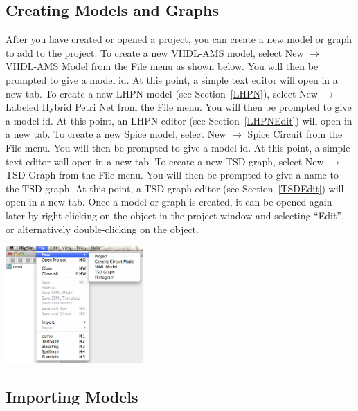 \documentclass[titlepage,11pt]{article}
\begin{document}
\subsection{Creating Models and Graphs}

\noindent
After you have created or opened a project, you can create a
new model or graph to add to the project.  To create a new 
VHDL-AMS model, select  New $\rightarrow$ VHDL-AMS Model from the
File menu as shown below. You will then be prompted to give a model id. At this
point, a simple text editor will open in a new tab. To create a new LHPN model 
(see Section~\ref{LHPN}), select New $\rightarrow$ Labeled Hybrid Petri Net from
the File menu. You will then be prompted to give a model id.  At this point, an
LHPN editor (see Section~\ref{LHPNEdit}) will open in a new tab. To create a new
Spice model, select New $\rightarrow$ Spice Circuit from the File menu.  You
will then be prompted to give a model id.  At this point, a simple text editor
will open in a new tab.  To create a new TSD graph, select New $\rightarrow$ TSD
Graph from the File menu. You will then
be prompted to give a name to the TSD graph.  At this point, a TSD graph editor
(see Section~\ref{TSDEdit}) will open in a new tab.   Once a model or graph is 
created, it can be opened again later by right clicking on the object in the
project window and selecting ``Edit'', or alternatively
double-clicking on the object.
\begin{center}
\includegraphics[height=45mm]{screenshots/newModel}
\end{center}

\subsection{Importing Models}
\end{document}

